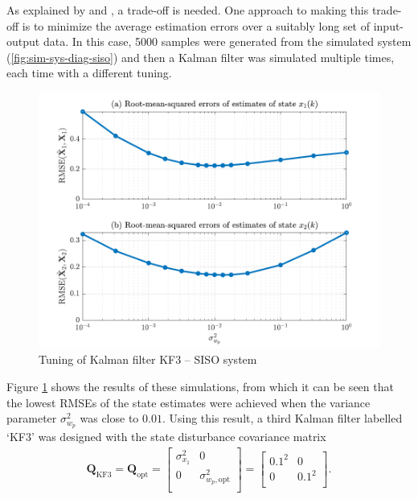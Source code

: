 As explained by \cite{andersson_adaptive_1985} and \cite{robertson_detection_1995}, a trade-off is needed. One approach to making this trade-off is to minimize the average estimation errors over a suitably long set of input-output data. In this case, 5000 samples were generated from the simulated system (\ref{fig:sim-sys-diag-siso}) and then a Kalman filter was simulated multiple times, each time with a different tuning. 
\begin{figure}[htp]
	\centering
	\includegraphics[width=13cm]{images/rod_obs_sim1_3KF_Q_seed_6.pdf}
	\caption{Tuning of Kalman filter KF3 – SISO system}
	\label{fig:sim-sys-siso-KF3-tuning}
\end{figure}
Figure \ref{fig:sim-sys-siso-KF3-tuning} shows the results of these simulations, from which it can be seen that the lowest \gls{RMSE}s of the state estimates were achieved when the variance parameter $\sigma_{w_p}^2$ was close to $0.01$. Using this result, a third Kalman filter labelled `KF3' was designed with the state disturbance covariance matrix 
\begin{equation} \label{eq:sim-sys-siso-KF3-Q}
	\begin{aligned}
		\mathbf{Q}_{\text{KF3}}=\mathbf{Q}_{\text{opt}}=\begin{bmatrix}
			\sigma_{x_1}^2 & 0 \\
			0 & \sigma_{w_p,\text{opt}}^2 \\
		\end{bmatrix}=\begin{bmatrix}
			0.1^2 & 0 \\
			0 & 0.1^2 \\
		\end{bmatrix}.
	\end{aligned}
\end{equation}

